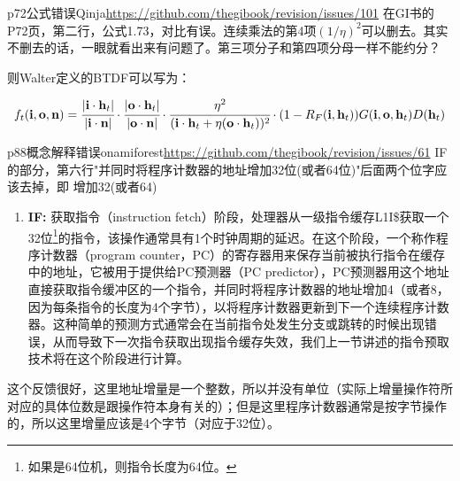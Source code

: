 \begin{revision}{p72}{公式错误}{Qinja}{\url{https://github.com/thegibook/revision/issues/101}}
	在GI书的P72页，第二行，公式1.73，对比有误。连续乘法的第4项$(1/\eta)^2$可以删去。其实不删去的话，一眼就看出来有问题了。第三项分子和第四项分母一样不能约分？
\end{revision}

\noindent 则Walter定义的BTDF可以写为：

\begin{equation}\renewcommand\thefigure{1.73}
	f_t(\mathbf{i},\mathbf{o},\mathbf{n})= \cfrac{|\mathbf{i}\cdot\mathbf{h}_t|}{|\mathbf{i}\cdot\mathbf{n}|}\cdot \cfrac{|\mathbf{o}\cdot\mathbf{h}_t|}{|\mathbf{o}\cdot\mathbf{n}|}\cdot \cfrac{\eta^2}{(\mathbf{i}\cdot\mathbf{h}_t+\eta(\mathbf{o}\cdot\mathbf{h}_t))^2}\cdot (1-R_F(\mathbf{i},\mathbf{h}_t))G(\mathbf{i},\mathbf{o},\mathbf{h}_t)D(\mathbf{h}_t)
\end{equation}





\begin{revision}{p88}{概念解释错误}{onamiforest}{\url{https://github.com/thegibook/revision/issues/61}}
IF的部分，第六行"并同时将程序计数器的地址增加32位(或者64位)"后面两个位字应该去掉，即 增加32(或者64)
\end{revision}

\setcounter{footnote}{1}
\begin{enumerate}
	\item \textbf{IF: } 获取指令（instruction fetch）阶段，处理器从一级指令缓存L1I\$获取一个32位\footnote{如果是64位机，则指令长度为64位。}的指令，该操作通常具有1个时钟周期的延迟。在这个阶段，一个称作程序计数器（program counter，PC）的寄存器用来保存当前被执行指令在缓存中的地址，它被用于提供给PC预测器（PC predictor），PC预测器用这个地址直接获取指令缓冲区的一个指令，并同时将程序计数器的地址增加4（或者8，因为每条指令的长度为4个字节），以将程序计数器更新到下一个连续程序计数器。这种简单的预测方式通常会在当前指令处发生分支或跳转的时候出现错误，从而导致下一次指令获取出现指令缓存失效，我们上一节讲述的指令预取技术将在这个阶段进行计算。
\end{enumerate}

\begin{myshaded}
	这个反馈很好，这里地址增量是一个整数，所以并没有单位（实际上增量操作符所对应的具体位数是跟操作符本身有关的）；但是这里程序计数器通常是按字节操作的，所以这里增量应该是4个字节（对应于32位）。
\end{myshaded}






